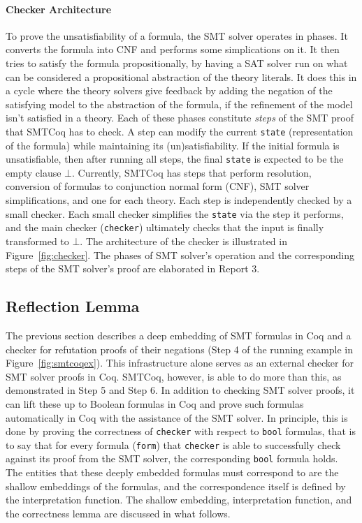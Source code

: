 \documentclass[11pt]{article}
\begin{document}
	\paragraph{Checker Architecture}
	To prove the unsatisfiability of a 
	formula, the SMT solver operates in 
	phases. It converts the formula into
	CNF and performs some simplications
	on it. It then tries to satisfy the
	formula propositionally, by having 
	a SAT solver run on what can 
	be considered a propositional
	abstraction of the theory literals.
	It does this in a cycle where the 
	theory solvers give feedback
	by adding the negation of the 
	satisfying model to the 
	abstraction of the formula, if the 
	refinement of the model isn't 
	satisfied in a theory. 
	Each of these phases constitute
	\textit{steps} of the SMT proof
	that SMTCoq has to check. A step
	can modify the current 
	\texttt{state} (representation of 
	the formula) while maintaining 
	its (un)satisfiability. If the 
	initial formula is unsatisfiable, 
	then after running all steps,
	the final \texttt{state} is expected
	to be the empty clause $\bot$. 
	Currently, SMTCoq has steps that 
	perform resolution, conversion of 
	formulas to conjunction normal 
	form (CNF), SMT solver 
	simplifications, and one for 
	each theory. Each step is 
	independently checked by a small 
	checker. Each small
	checker simplifies the  
	\texttt{state} via the step it 
	performs, and the main checker 
	(\texttt{checker}) ultimately checks 
	that the input is 
	finally transformed to $\bot$. The 
	architecture of the checker is 
	illustrated in
	Figure~\ref{fig:checker}. The phases 
	of SMT solver's operation and the 
	corresponding steps of the
	SMT solver's proof are elaborated
	in Report 3.
	
	\subsection{Reflection Lemma}
	\label{sec:refl}
	The previous section describes a 
	deep embedding of SMT formulas 
	in Coq and a checker for 
	refutation proofs of their 
	negations (Step 4 of 
	the running example in 
	Figure~\ref{fig:smtcoqex}). 
	This infrastructure alone serves 
	as an external checker for 
	SMT solver proofs in Coq.
	SMTCoq, however, is able to 
	do more than this, as demonstrated
	in Step 5 and Step 6. In addition 
	to checking SMT solver proofs, 
	it can lift these up to 
	Boolean formulas in Coq and
	prove such formulas automatically
	in Coq with the assistance of 
	the SMT solver. In principle,
	this is done by proving the
	correctness of \texttt{checker}
	with respect to \texttt{bool}
	formulas, that is to say that 
	for every formula (\texttt{form})
	that \texttt{checker} is able to 
	successfully check against its
	proof from the SMT solver, the 
	corresponding \texttt{bool}
	formula holds. The entities
	that these deeply embedded formulas 
	must correspond to are the shallow
	embeddings of the formulas, and the 
	correspondence 
	itself is defined by the 
	interpretation function. The 
	shallow embedding, interpretation
	function, and the correctness 
	lemma are discussed in what
	follows.
	
\end{document}
